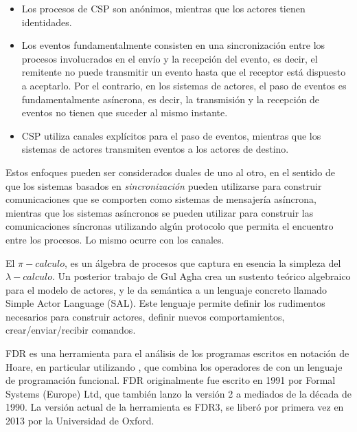 \begin{itemize}
\item Los procesos de CSP son anónimos, mientras que los actores tienen identidades.
\item Los eventos fundamentalmente consisten en una sincronización entre los procesos involucrados en el envío y la recepción del evento, es decir, el remitente no puede transmitir un evento hasta que el receptor está dispuesto a aceptarlo. Por el contrario, en los sistemas de actores, el paso de eventos es fundamentalmente asíncrona, es decir, la transmisión y la recepción de eventos no tienen que suceder al mismo instante.
\item CSP utiliza canales explícitos para el paso de eventos, mientras que los sistemas de actores transmiten eventos a los actores de destino.
\end{itemize}

Estos enfoques pueden ser considerados duales de uno al otro, en el sentido de que los sistemas basados en \emph{sincronización} pueden utilizarse para construir comunicaciones que se comporten como sistemas de mensajería asíncrona, mientras que los sistemas asíncronos se pueden utilizar para construir las comunicaciones síncronas utilizando algún protocolo que permita el encuentro entre los procesos. Lo mismo ocurre con los canales.

El $\pi-calculo$, es un álgebra de procesos que captura en esencia la simpleza del $\lambda-calculo$. Un posterior trabajo de Gul Agha\cite{apicalculus} crea un sustento teórico algebraico para el modelo de actores, y le da semántica a un lenguaje concreto llamado Simple Actor Language (SAL). Este lenguaje permite definir los rudimentos necesarios para construir actores, definir nuevos comportamientos, crear/enviar/recibir comandos.

FDR es una herramienta para el análisis de los programas escritos en notación \CSP de Hoare, en particular utilizando \CSPm, que combina los operadores de \CSP con un lenguaje de programación funcional. FDR originalmente fue escrito en 1991 por Formal Systems (Europe) Ltd, que también lanzo la versión 2 a mediados de la década de 1990. La versión actual de la herramienta es FDR3, se liberó por primera vez en 2013 por la Universidad de Oxford.
